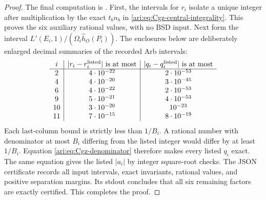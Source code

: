 \begin{proof}
The final computation is
. First, the intervals for
$r_i$ isolate a unique integer after multiplication by the exact
$t_bn_b$ in \eqref{ari:eq:Cgz-central-integrality}. This proves the
six auxiliary rational values, with no BSD input. Next form the
interval $L'(E_i,1)/(\Omega_i\widehat h_O(P_i))$. The enclosures
below are deliberately enlarged decimal summaries of the recorded
Arb intervals:
\[
\begin{array}{c|c|c}
 i&|r_i-r_i^{\rm listed}|\text{ is at most}
   &|q_i-q_i^{\rm listed}|\text{ is at most}\\\hline
 2&4\cdot10^{-22}&2\cdot10^{-53}\\
 4&4\cdot10^{-20}&3\cdot10^{-45}\\
 6&4\cdot10^{-22}&2\cdot10^{-53}\\
 9&5\cdot10^{-21}&4\cdot10^{-53}\\
 10&3\cdot10^{-20}&10^{-23}\\
 11&7\cdot10^{-15}&8\cdot10^{-19}
\end{array}
\]
Each last-column bound is strictly less than $1/B_i$. A rational
number with denominator at most $B_i$ differing from the listed
integer would differ by at least $1/B_i$. Equation
\eqref{ari:eq:Cgz-denominator} therefore makes every listed $q_i$
exact. The same equation gives the listed $|a_i|$ by integer
square-root checks. The JSON certificate records all input
intervals, exact invariants, rational values, and positive separation
margins. Its stdout concludes that all six remaining factors are
exactly certified. This completes the proof.
\end{proof}
